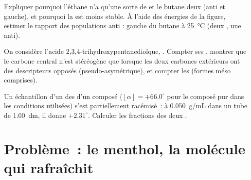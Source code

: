 \begin{exercise}[$\star\star\star$]\label{exo:b1:stereochemistry-in-depth:10}
Expliquer pourquoi l'éthane n'a qu'une sorte de  et
le butane deux (anti et gauche), et pourquoi la  est
moins stable. À l'aide des énergies de la figure, estimer le rapport des
populations anti : gauche du butane à \qty{25}{\celsius} (deux
, une anti).
\end{exercise}

\begin{exercise}[$\star\star\star$]\label{exo:b1:stereochemistry-in-depth:11}
On considère l'acide 2,3,4-trihydroxypentanedioïque,
. Compter ses ,
montrer que le carbone central n'est stéréogène que lorsque les deux
carbones extérieurs ont des descripteurs opposés (pseudo-asymétrique),
et compter les  (formes méso comprises).
\end{exercise}

\begin{exercise}[$\star\star\star$]\label{exo:b1:stereochemistry-in-depth:12}
Un échantillon d'un des  d'un composé
($[\alpha] = +66.0^\circ$ pour le composé pur dans les conditions utilisées) s'est
partiellement racémisé~: à \qty{0.050}{g/mL} dans un tube de
\qty{1.00}{dm}, il donne $+2.31^\circ$. Calculer les fractions des deux
.
\end{exercise}

\section{Problème~: le menthol, la molécule qui rafraîchit}

